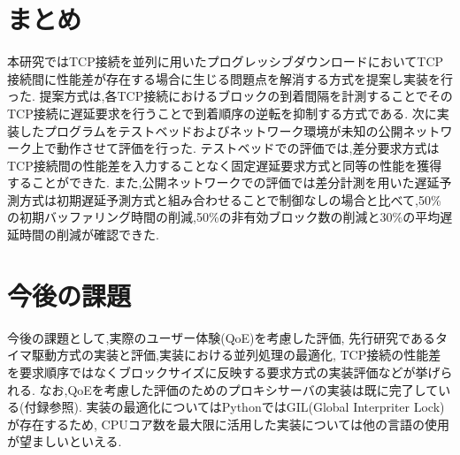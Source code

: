\documentclass[a4j,12pt]{gradthesis_utf8}
\begin{document}
\section{まとめ}
本研究ではTCP接続を並列に用いたプログレッシブダウンロードにおいてTCP接続間に性能差が存在する場合に生じる問題点を解消する方式を提案し実装を行った.
提案方式は,各TCP接続におけるブロックの到着間隔を計測することでそのTCP接続に遅延要求を行うことで到着順序の逆転を抑制する方式である.
次に実装したプログラムをテストベッドおよびネットワーク環境が未知の公開ネットワーク上で動作させて評価を行った.
テストベッドでの評価では,差分要求方式はTCP接続間の性能差を入力することなく固定遅延要求方式と同等の性能を獲得することができた.
また,公開ネットワークでの評価では差分計測を用いた遅延予測方式は初期遅延予測方式と組み合わせることで制御なしの場合と比べて,50\%の初期バッファリング時間の削減,50\%の非有効ブロック数の削減と30\%の平均遅延時間の削減が確認できた.


\section{今後の課題}
今後の課題として,実際のユーザー体験(QoE)を考慮した評価\cite{future},
先行研究であるタイマ駆動方式の実装と評価,実装における並列処理の最適化,
TCP接続の性能差を要求順序ではなくブロックサイズに反映する要求方式の実装評価などが挙げられる.
なお,QoEを考慮した評価のためのプロキシサーバの実装は既に完了している(付録参照).
実装の最適化についてはPythonではGIL(Global Interpriter Lock)が存在するため,
CPUコア数を最大限に活用した実装については他の言語の使用が望ましいといえる.
\end{document}

